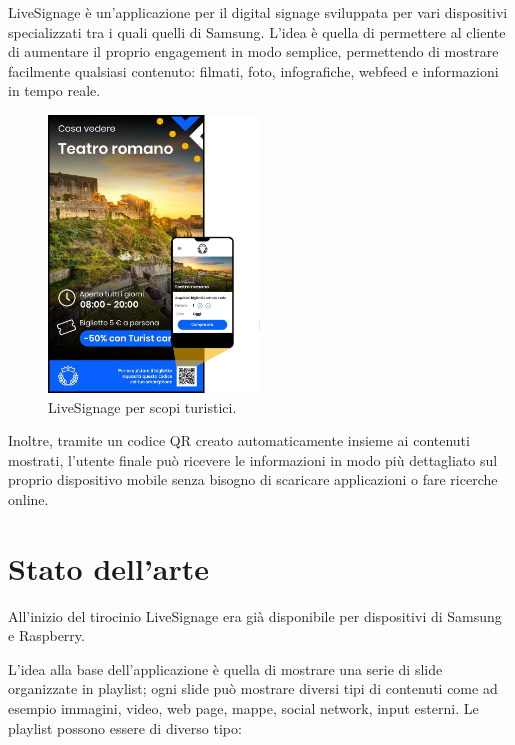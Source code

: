 LiveSignage è un’applicazione per il digital signage sviluppata per vari dispositivi specializzati tra i quali quelli di Samsung. L’idea è quella di permettere al cliente di aumentare il proprio engagement in modo semplice, permettendo di mostrare facilmente qualsiasi contenuto: filmati, foto, infografiche, webfeed e informazioni in tempo reale.

\begin{figure}[!htb]
    \centering
    \includegraphics[width= 0.5\textwidth]{images/Introduzione/LiveTurist.jpg} 
    \caption{LiveSignage per scopi turistici.} 
\end{figure}

Inoltre, tramite un codice QR creato automaticamente insieme ai contenuti mostrati, l'utente finale può ricevere le informazioni in modo più dettagliato sul proprio dispositivo mobile senza bisogno di scaricare applicazioni o fare ricerche online.


\section{Stato dell'arte}

All'inizio del tirocinio LiveSignage era già disponibile per dispositivi di Samsung e Raspberry.  

L'idea alla base dell'applicazione è quella di mostrare una serie di slide organizzate in playlist; ogni slide può mostrare diversi tipi di contenuti come ad esempio immagini, video, web page, mappe, social network, input esterni. Le playlist possono essere di diverso tipo:

